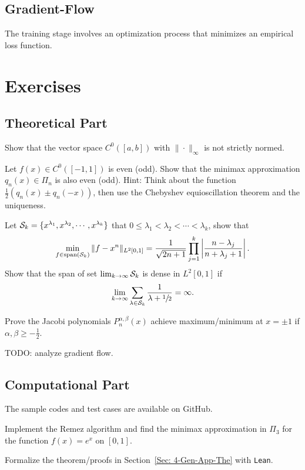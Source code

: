 \subsection{Gradient-Flow}
The training stage involves an optimization process that minimizes an empirical loss function.
\section{Exercises}
\subsection{Theoretical Part}
\begin{problem}
    Show that the vector space $C^0([a, b])$ with $\|\cdot\|_{\infty}$ is not strictly normed.
\end{problem}
\begin{problem}
    Let $f(x)\in C^0([-1,1])$ is even (odd). Show that the minimax approximation $q_n(x)\in\Pi_n$ is also even (odd).
    Hint: Think about the function $\frac{1}{2}(q_n(x) \pm q_n(-x))$, then use the Chebyshev equioscillation theorem and the uniqueness.
\end{problem}
\begin{problem}
    Let $\mathcal S_k = \{x^{\lambda_1}, x^{\lambda_2}, \cdots, x^{\lambda_k}\}$ that $0\le \lambda_1 < \lambda_2 < \cdots < \lambda_k$, show that 
    \begin{equation}\nonumber
        \min_{f\in \textrm{span}(\mathcal S_k)} \|f - x^{n}\|_{L^2[0, 1]} = \frac{1}{\sqrt{2n+1}}\prod_{j=1}^k\left|\frac{n - \lambda_j}{n + \lambda_j + 1}\right|.
    \end{equation}
    Show that the span of set $\lim_{k\to\infty}\mathcal S_k$ is dense in $L^2[0, 1]$ if 
    \begin{equation}
      \lim_{k\to\infty}  \sum_{\lambda\in \mathcal S_k} \frac{1}{\lambda+\sfrac{1}{2}} = \infty. 
    \end{equation}
\end{problem}
\begin{problem}
    Prove the Jacobi polynomials $P_n^{\alpha, \beta}(x)$ achieve maximum/minimum at $x= \pm 1$ if $\alpha, \beta \ge -\frac{1}{2}$.  
\end{problem}

\begin{problem}
    TODO: analyze gradient flow.
\end{problem}
\subsection{Computational Part}
The sample codes and test cases are available on GitHub. 
\begin{problem}
    Implement the Remez algorithm and find the minimax approximation in $\Pi_3$ for the function $f(x) = e^x$ on $[0, 1]$.
\end{problem}

\begin{problem}
    Formalize the theorem/proofs in Section~\ref{Sec: 4-Gen-App-The} with \texttt{Lean}.
\end{problem}

\nocite{trefethen2019approximation,cheney2009course, muskhelishvili2008singular, elliott1974asymptotic}


